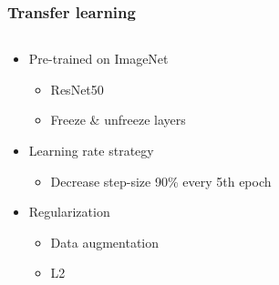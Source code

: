 \documentclass{beamer}
\begin{document}



\begin{frame}
\frametitle{Transfer learning}
\begin{columns}
\begin{column}{0.5\textwidth}
\begin{itemize}
\setlength{\itemsep}{2em} 
    \item Pre-trained on ImageNet 
    \begin{itemize}
        \item ResNet50
        \item Freeze \& unfreeze layers
    \end{itemize}

    \item Learning rate strategy        \begin{itemize}
        \item Decrease step-size 90\% every 5th epoch 
    \end{itemize}
    \item Regularization

    
    \begin{itemize}
        \item Data augmentation
        \item L2
    \end{itemize}


\end{itemize}
\end{column}
\end{columns}
\end{frame}
\end{document}
